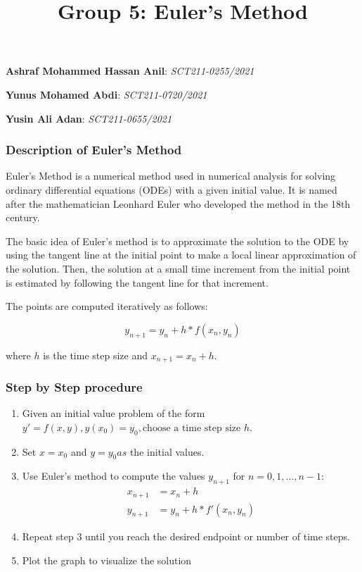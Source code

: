 \documentclass{beamer}
\title{Group 5: Euler's Method}
\begin{document}
\begin{frame}
  \titlepage
  \begin{center}
  \textbf{Ashraf Mohammed Hassan Anil}: \textit{SCT211-0255/2021}
  
  \textbf{Yunus Mohamed Abdi}: \textit{SCT211-0720/2021}
  
  \textbf{Yusin Ali Adan}: \textit{SCT211-0655/2021}
  \end{center}
\end{frame}

\begin{frame}
  \frametitle{Description of Euler's Method}
Euler's Method is a numerical method used in numerical analysis for solving ordinary differential equations (ODEs) with a given initial value. It is named after the mathematician Leonhard Euler who developed the method in the 18th century.

The basic idea of Euler's method is to approximate the solution to the ODE by using the tangent line at the initial point to make a local linear approximation of the solution. Then, the solution at a small time increment from the initial point is estimated by following the tangent line for that increment.

The points are computed iteratively as follows:

$$y_{n+1} = y_n + h * f(x_n, y_n)$$

where $h$ is the time step size and $x_{n+1} = x_n + h.$
\end{frame}

\begin{frame}
  \frametitle{Step by Step procedure}
  \begin{enumerate}
    \item Given an initial value problem of the form $y' = f(x, y), y(x_0) = y_0, \text{choose a time step size }h.$

    \item Set $x = x_0$ and $y = y_0 as$ the initial values.

    \item Use Euler's method to compute the values $y_{n+1}$ for $n = 0, 1, \ldots, n-1$:
          \begin{align*}
            x_{n+1} &= x_n + h \\
            y_{n+1} &= y_n+ h*f'(x_n, y_n)
          \end{align*}
    \item Repeat step 3 until you reach the desired endpoint or number of time steps.
    \item Plot the graph to visualize the solution
  \end{enumerate}
\end{frame}
\end{document}
